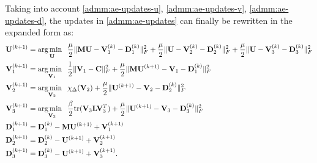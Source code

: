 Taking into account \eqref{admm:ae-updates-u}, \eqref{admm:ae-updates-v}, \eqref{admm:ae-updates-d}, the updates in \eqref{admm:ae-updates} can finally be rewritten in the expanded form as:
\begin{equation}
  \label{admm:ae-updates-final}
  \begin{aligned}
    \mathbf{U}^{(k+1)} & = \operatorname*{arg\,min \;\;}_{\mathbf{U}}  
    \frac{\mu}{2} \|\mathbf{MU} - \mathbf{V}_1^{(k)} - \mathbf{D}_1^{(k)}\|_F^2  + \frac{\mu}{2} \|\mathbf{U} - \mathbf{V}_2^{(k)} - \mathbf{D}_2^{(k)}\|_F^2  + \frac{\mu}{2} \|\mathbf{U} - \mathbf{V}_3^{(k)} - \mathbf{D}_3^{(k)}\|_F^2 
    \\
    \mathbf{V}_1^{(k+1)} &= \operatorname*{arg\,min \;\;}_{\mathbf{V}_1} \frac{1}{2} \|\mathbf{V}_1 - \mathbf{C} \|_F^2 + \frac{\mu}{2} \|\mathbf{MU}^{(k+1)} - \mathbf{V}_1 - \mathbf{D}_1^{(k)}\|_F^2 \\
    \mathbf{V}_2^{(k+1)} &= \operatorname*{arg\,min \;\;}_{\mathbf{V}_2} \chi_{\Delta}(\mathbf{V}_2) + \frac{\mu}{2} \|\mathbf{U}^{(k+1)} - \mathbf{V}_2 - \mathbf{D}_2^{(k)}\|_F^2 \\
    \mathbf{V}_3^{(k+1)} &= \operatorname*{arg\,min \;\;}_{\mathbf{V}_3} \frac{\beta}{2}\text{tr}(\mathbf{V}_3\mathbf{L}\mathbf{V}_3^T) + \frac{\mu}{2} \|\mathbf{U}^{(k+1)} - \mathbf{V}_3 - \mathbf{D}_3^{(k)}\|_F^2 \\
    \mathbf{D}_1^{(k+1)} &= \mathbf{D}_1^{(k)} - \mathbf{MU}^{(k+1)} + \mathbf{V}_1^{(k+1)} \\
    \mathbf{D}_2^{(k+1)} &= \mathbf{D}_2^{(k)} - \mathbf{U}^{(k+1)} + \mathbf{V}_2^{(k+1)} \\
    \mathbf{D}_3^{(k+1)} &= \mathbf{D}_3^{(k)} - \mathbf{U}^{(k+1)} + \mathbf{V}_3^{(k+1)}.
  \end{aligned}
\end{equation}


